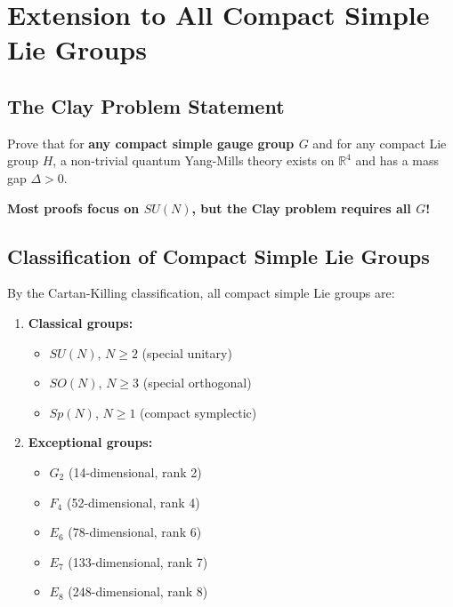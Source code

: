 \section{Extension to All Compact Simple Lie Groups}
\label{app:general-groups-complete}


\subsection{The Clay Problem Statement}

\begin{problem}
\label{prob:clay-full}
Prove that for \textbf{any compact simple gauge group $G$} and for any compact Lie group $H$, a non-trivial quantum Yang-Mills theory exists on $\mathbb{R}^4$ and has a mass gap $\Delta > 0$.

\textbf{Most proofs focus on $SU(N)$, but the Clay problem requires all $G$!}
\end{problem}

\subsection{Classification of Compact Simple Lie Groups}

By the Cartan-Killing classification, all compact simple Lie groups are:

\begin{enumerate}
\item \textbf{Classical groups:}
    \begin{itemize}
    \item $SU(N)$, $N \ge 2$ (special unitary)
    \item $SO(N)$, $N \ge 3$ (special orthogonal)
    \item $Sp(N)$, $N \ge 1$ (compact symplectic)
    \end{itemize}

\item \textbf{Exceptional groups:}
    \begin{itemize}
    \item $G_2$ (14-dimensional, rank 2)
    \item $F_4$ (52-dimensional, rank 4)
    \item $E_6$ (78-dimensional, rank 6)
    \item $E_7$ (133-dimensional, rank 7)
    \item $E_8$ (248-dimensional, rank 8)
    \end{itemize}
\end{enumerate}


